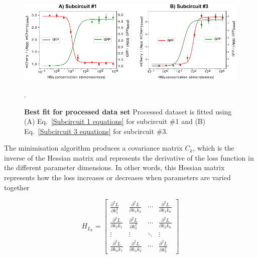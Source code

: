 \begin{figure}[H] %
    \centering
    \begin{adjustbox}{center}
        \includegraphics[width=1\textwidth]{chapters/Chapter 2/dose_responses_bestfit} %
    \end{adjustbox}
    \caption{\textbf{Best fit for processed data set} Processed dataset is fitted using (A) Eq.~\ref{Subcircuit 1 equations} for subcircuit \#1 and (B) Eq.~\ref{Subcircuit 3 equations} for subcircuit \#3.}
    .
    \label{fig:dose_responses_bestfit} %
\end{figure}


The minimisation algorithm produces a covariance matrix $C_k$,
which is the inverse of the Hessian matrix
and represents the derivative of the loss function in the different parameter dimensions.
In other words, this Hessian matrix represents how the loss increases or decreases when parameters are varied together

\begin{equation}
    H_{L_{k}} = \begin{bmatrix}
                     \frac{\partial^2 L}{\partial k_1^2} & \frac{\partial^2 L}{\partial k_1 k_2} & \cdots & \frac{\partial^2 L}{\partial k_1 k_{n}} \\
                     \frac{\partial^2 L}{\partial k_2 k_1} & \frac{\partial^2 L}{\partial k_2^2} & \cdots & \frac{\partial^2 L}{\partial k_2  k_{n}} \\
                     \vdots & \vdots & \ddots & \vdots \\
                     \frac{\partial^2 L}{\partial k_{n}k_1} & \frac{\partial^2 L}{\partial k_{n}  k_2} & \cdots & \frac{\partial^2 L}{\partial k_{n}^2}
    \end{bmatrix}
\end{equation}



